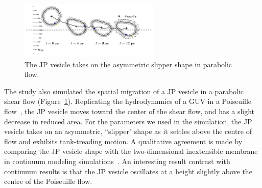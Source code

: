 \begin{figure}
\includegraphics[width=0.6\textwidth]{figures/PreliminaryWork/Slipper.jpg}
\caption{\label{fig:JP_poiseuille}The JP vesicle takes on the asymmetric
  slipper shape in parabolic flow.}
\end{figure}
The study also simulated the spatial migration of a JP vesicle in a
parabolic shear flow (Figure~\ref{fig:JP_poiseuille}). Replicating the
hydrodynamics of a GUV in a Poiseuille flow~\cite{Kaoui09,
dan_vla_mis2009, cou_kao_pod_mis2008}, the JP vesicle moves toward the
center of the shear flow, and has a slight decrease in reduced area.
For the parameters we used in the simulation, the JP vesicle takes on an
asymmetric, ``slipper" shape as it settles above the centre of flow and
exhibits tank-treading motion. A qualitative agreement is made by
comparing the JP vesicle shape with the two-dimensional inextensible
membrane in continuum modeling simulations~\cite{Kaoui09,
dan_vla_mis2009, cou_kao_pod_mis2008}. An interesting result contrast
with continuum results is that the JP vesicle oscillates at a height
slightly above the centre of the Poiseuille flow. 



